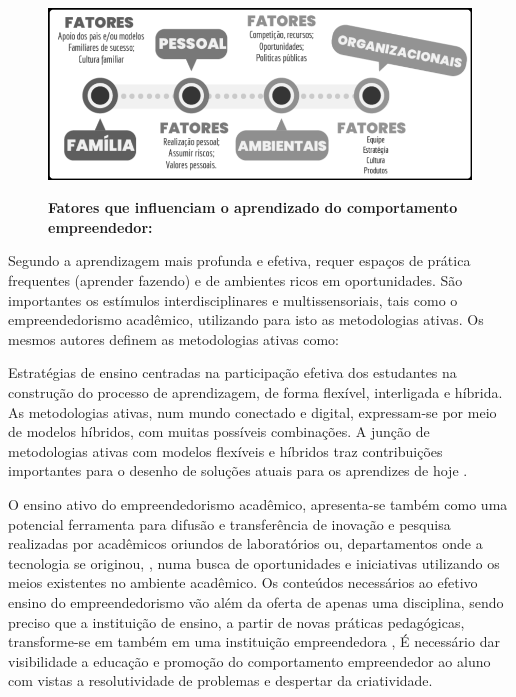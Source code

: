 \begin{figure}[H]
\centering
\caption{\textbf{Fatores que influenciam o aprendizado do comportamento empreendedor:}}
\includegraphics[scale=0.5]{Imagens/esquema_influencias_empreendedorismo.png}
\label{figura_2}
\end{figure}


Segundo  a aprendizagem mais profunda e efetiva, requer espaços de prática frequentes (aprender fazendo) e de ambientes ricos em oportunidades.  São importantes os estímulos interdisciplinares e multissensoriais, tais como o empreendedorismo acadêmico, utilizando para isto as metodologias ativas. Os mesmos autores definem as metodologias ativas como:

\begin{citacao}
Estratégias de ensino centradas na participação efetiva dos estudantes na construção do processo de aprendizagem, de forma flexível, interligada e híbrida. As metodologias ativas, num mundo conectado e digital, expressam-se por meio de modelos híbridos, com muitas possíveis combinações. A junção de metodologias ativas com modelos flexíveis e híbridos traz contribuições importantes para o desenho de soluções atuais para os aprendizes de hoje \cite{bacich_metodologias_2018}.
\end{citacao}

O ensino ativo do empreendedorismo acadêmico, apresenta-se também como uma potencial ferramenta para difusão e transferência de inovação e pesquisa realizadas por acadêmicos oriundos de laboratórios ou, departamentos onde a tecnologia se originou, \cite{guo_what_2019, abreu_nature_2013}, numa busca de oportunidades e iniciativas utilizando os meios existentes no ambiente acadêmico. Os conteúdos necessários ao efetivo ensino do empreendedorismo vão além da oferta de apenas uma disciplina, sendo preciso que a instituição de ensino, a partir de novas práticas pedagógicas, transforme-se em também em uma instituição empreendedora \cite{campelli_empreendedorismo_2011}, É necessário dar visibilidade a educação e promoção do comportamento empreendedor ao aluno com vistas a resolutividade de problemas \cite{degen_o_1989} e despertar da criatividade.

